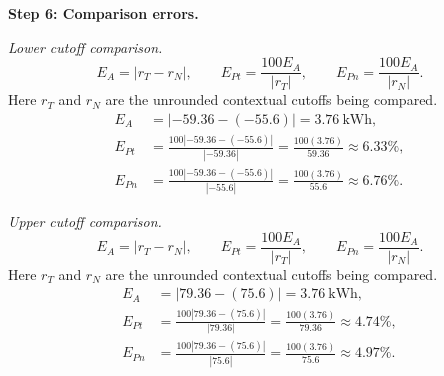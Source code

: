 \begin{enumerate}[leftmargin=*,label=\textbf{\arabic*.},itemsep=12pt,parsep=3pt,topsep=5pt]
\begin{minipage}{\linewidth}
\end{minipage}\par
\par\textbf{Step 6: Comparison errors.}\nopagebreak\enspace \par\noindent\begin{minipage}{\linewidth}
\par\textit{Lower cutoff comparison.}
\[
E_A=|r_T-r_N|,\qquad E_{Pt}=\frac{100E_A}{|r_T|},\qquad E_{Pn}=\frac{100E_A}{|r_N|}.
\]
Here $r_T$ and $r_N$ are the unrounded contextual cutoffs being compared.
\[
\begin{aligned}
E_A&=|-59.36-(-55.6)|=3.76\ \text{kWh},\\
E_{Pt}&=\frac{100|-59.36-(-55.6)|}{|-59.36|}=\frac{100(3.76)}{59.36}\approx 6.33\%,\\
E_{Pn}&=\frac{100|-59.36-(-55.6)|}{|-55.6|}=\frac{100(3.76)}{55.6}\approx 6.76\%.
\end{aligned}
\]
\end{minipage}\par
\par\noindent\begin{minipage}{\linewidth}
\par\textit{Upper cutoff comparison.}
\[
E_A=|r_T-r_N|,\qquad E_{Pt}=\frac{100E_A}{|r_T|},\qquad E_{Pn}=\frac{100E_A}{|r_N|}.
\]
Here $r_T$ and $r_N$ are the unrounded contextual cutoffs being compared.
\[
\begin{aligned}
E_A&=|79.36-(75.6)|=3.76\ \text{kWh},\\
E_{Pt}&=\frac{100|79.36-(75.6)|}{|79.36|}=\frac{100(3.76)}{79.36}\approx 4.74\%,\\
E_{Pn}&=\frac{100|79.36-(75.6)|}{|75.6|}=\frac{100(3.76)}{75.6}\approx 4.97\%.
\end{aligned}
\]
\end{minipage}\par


\end{enumerate}
